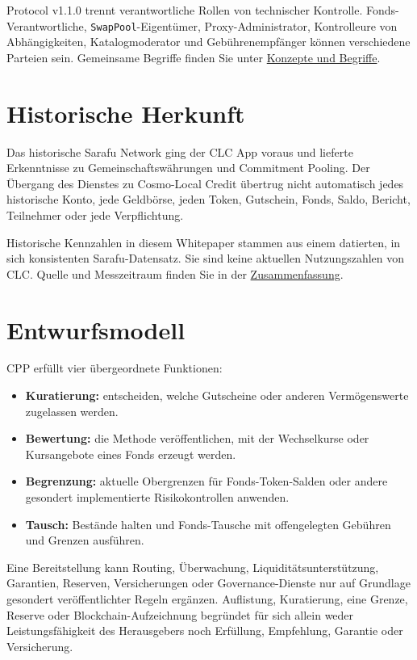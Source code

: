 \documentclass[11pt]{article}
\begin{document}
Protocol v1.1.0 trennt verantwortliche Rollen von technischer Kontrolle. Fonds-Verantwortliche, \texttt{SwapPool}-Eigentümer, Proxy-Administrator, Kontrolleure von Abhängigkeiten, Katalogmoderator und Gebührenempfänger können verschiedene Parteien sein. Gemeinsame Begriffe finden Sie unter \href{https://docs.cosmolocal.credit/de/introduction/concepts}{Konzepte und Begriffe}.

\section*{Historische Herkunft}

Das historische Sarafu Network ging der CLC App voraus und lieferte Erkenntnisse zu Gemeinschaftswährungen und Commitment Pooling. Der Übergang des Dienstes zu Cosmo-Local Credit übertrug nicht automatisch jedes historische Konto, jede Geldbörse, jeden Token, Gutschein, Fonds, Saldo, Bericht, Teilnehmer oder jede Verpflichtung.

Historische Kennzahlen in diesem Whitepaper stammen aus einem datierten, in sich konsistenten Sarafu-Datensatz. Sie sind keine aktuellen Nutzungszahlen von CLC. Quelle und Messzeitraum finden Sie in der \href{https://docs.cosmolocal.credit/de/white-paper/executive-summary}{Zusammenfassung}.

\section*{Entwurfsmodell}

CPP erfüllt vier übergeordnete Funktionen:

\begin{itemize}[leftmargin=*]
\item \textbf{Kuratierung:} entscheiden, welche Gutscheine oder anderen Vermögenswerte zugelassen werden.
\item \textbf{Bewertung:} die Methode veröffentlichen, mit der Wechselkurse oder Kursangebote eines Fonds erzeugt werden.
\item \textbf{Begrenzung:} aktuelle Obergrenzen für Fonds-Token-Salden oder andere gesondert implementierte Risikokontrollen anwenden.
\item \textbf{Tausch:} Bestände halten und Fonds-Tausche mit offengelegten Gebühren und Grenzen ausführen.
\end{itemize}
Eine Bereitstellung kann Routing, Überwachung, Liquiditätsunterstützung, Garantien, Reserven, Versicherungen oder Governance-Dienste nur auf Grundlage gesondert veröffentlichter Regeln ergänzen. Auflistung, Kuratierung, eine Grenze, Reserve oder Blockchain-Aufzeichnung begründet für sich allein weder Leistungsfähigkeit des Herausgebers noch Erfüllung, Empfehlung, Garantie oder Versicherung.
\end{document}
